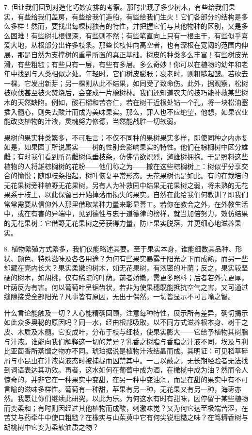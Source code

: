 7. 但让我们回到对造化巧妙安排的考察。那时出现了多少树木，有些给我们果实，有些给我们盖房，有些给我们造船，有些给我们生火！它们各部分的结构是多么多样！然而，要找出每棵树独有的特性，并把握它们与其他物种的区别，又是多么困难！有些树扎根很深，有些则不然；有些笔直向上只有一根主干，有些似乎喜爱大地，从根部分出许多枝条。那些长枝伸向高空者，也有深根在宽阔的范围内伸展，那是自然为支撑树的重量所置的真正基础。树皮的种类多么丰富！有些树皮光滑，有些粗糙；有些只有一层，有些有多层。多么奇妙！你可以在植物的幼年和老年中找到与人类相似之处。年轻时，它们树皮膨胀；衰老时，则粗糙起皱。若砍去一棵，它发出新芽；另一棵则从此不结果，如同受了致命伤。此外，据观察，松树被砍伐甚至被火焚烧后，会变成一片橡树林。我们还知道农夫的技巧能补救某些树木的天然缺陷。例如，酸石榴和苦杏仁，若在树干近根处钻一个孔，将一块松油塞插入髓心，则失去酸汁而成为美味果实。那么，罪人也不应绝望，他想，如果农业能改变植物的汁液，灵魂努力修德，当然能战胜一切软弱。\par

果树的果实种类繁多，不可胜言；不仅不同种的果树果实多样，即使同种之内亦复如是，如果园丁所说属实——树的性别会影响果实的特性。他们在棕榈树中区分雄雌；有时我们看到所谓雌树低垂枝条，仿佛情欲炽烈，邀雄树拥抱。于是照料这些植物的人将雄棕榈树的花粉——他们称之为——撒在这些棕榈树上：树似乎分享交合的愉悦；随即枝条抬起，树叶恢复平常形态。无花果树也是如此。有的在栽培的无花果树旁种植野无花果树，另有人为补救园中结果无花果树之弱，将未熟的无花果系于枝上，以此保留已开始掉落而损失的果实。自然在此给我们何教训？即我们常常需要从信仰外人那里借取某种力量来彰显善工。若你在教会之外，在外教生活中，或在有害的异端中，见到德性与忠于道德律的榜样，就当加倍努力，效仿结果的无花果树：它借野无花果树之旁获得力量，防止果实脱落，并更细心地滋养果实。\par

8. 植物繁殖方式繁多，我们仅能略述其要。至于果实本身，谁能细数其品种、形状、颜色、特殊滋味及各各用途？为何有些果实暴露于阳光之下而成熟，而另一些却藏在壳内长大？果实柔嫩的树木，如无花果树，有浓密的叶荫；反之，果实较坚硬的树木，如胡桃，仅有稀疏的叶荫。前者娇嫩，需更多照料；后者若外壳更厚，叶荫反为有害。何以葡萄叶呈锯齿状，若非为使果穗既能抵抗空气之害，又可通过缝隙接受全部阳光？凡事皆有原因，无出于偶然。一切皆显示不可言喻之智。\par

什么言论能触及一切？人心能精确回顾，注意每种特性，展示所有差异，确切揭示如此众多奥秘的原因吗？同一水，经由根部吸取，以不同方式滋养根本身、树干之皮、木质及木髓。它变成叶，分布于枝与细枝，使果实膨大——它给予植物其树脂与汁液。谁能向我们解释这一切的差异？乳香之树脂与香脂之汁液不同，埃及与利比亚茴香所蒸馏之物亦不同。琥珀据说是植物汁液结晶而成。其明证：可见稻草碎屑与小昆虫在汁液尚液态时被捕捉而囚禁其中。一言以蔽之，无长期经验者无法找到词语表达其功效。再者，这水如何在葡萄中成为酒，在橄榄中成为油？然而令人惊奇的，并非它在一种果实中变甜，在另一种中变油润，而是在甜的果实中有不可言喻的滋味多样性。葡萄有一种甜，苹果有另一种，无花果又有另一种，海枣亦然。我愿让你们继续此研究，以此为乐。为何这水有时有甜味，因停留于某些植物而变柔和；有时则因经过其他植物而成酸，刺激味觉？又为何它达至极端苦涩，在苦艾与药牵牛中使口粗糙？在橡实与山茱萸中它有何尖锐粗糙之味？在笃耨香树与胡桃树中它变为柔软油质之物？\par

